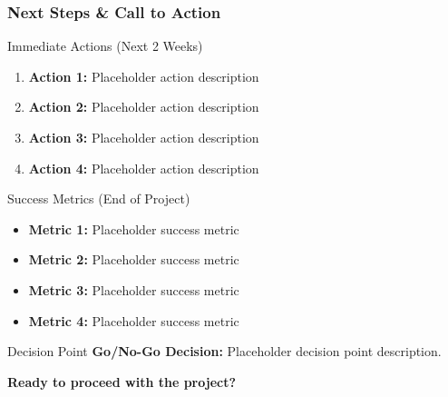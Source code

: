 \begin{frame}
\frametitle{Next Steps \& Call to Action}
\begin{block}{Immediate Actions (Next 2 Weeks)}
\begin{enumerate}
\item \textbf{Action 1:} Placeholder action description
\item \textbf{Action 2:} Placeholder action description
\item \textbf{Action 3:} Placeholder action description
\item \textbf{Action 4:} Placeholder action description
\end{enumerate}
\end{block}

\begin{block}{Success Metrics (End of Project)}
\begin{itemize}
\item \textbf{Metric 1:} Placeholder success metric
\item \textbf{Metric 2:} Placeholder success metric
\item \textbf{Metric 3:} Placeholder success metric
\item \textbf{Metric 4:} Placeholder success metric
\end{itemize}
\end{block}

\begin{alertblock}{Decision Point}
\textbf{Go/No-Go Decision:} Placeholder decision point description.
\end{alertblock}

\begin{center}
\Large
\textbf{Ready to proceed with the project?}
\end{center}
\end{frame}



